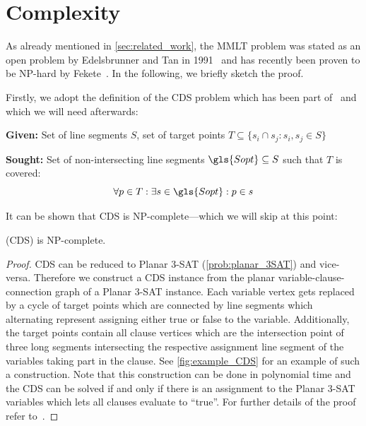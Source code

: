 \section{Complexity}
As already mentioned in \cref{sec:related_work}, the \gls{MMLT}
problem was stated as an open problem by Edelsbrunner and Tan in
1991~\cite{triangulation_minmax_length} and has recently been proven
to be NP-hard by Fekete~\cite{mmlt_complexity}. In the following, we
briefly sketch the proof.

Firstly, we adopt the definition of the \gls{CDS} problem which has
been part of~\cite{mmlt_complexity} and which we will need
afterwards:

\begin{problem}
  \label{prob:cds}\hfill
  \begin{labeling}{\hspace{4em}}
    \item[\textbf{Given:}]
      Set of line segments \(S\), 
      set of target points
      \(T \subseteq \{ s_i \cap s_j : s_i,s_j \in S \} \)
    \item[\textbf{Sought:}]
      Set of non-intersecting line segments
      \(\gls{Sopt} \subseteq S\) such that \(T\) is covered:
      \[ \forall p \in T: \exists s \in \gls{Sopt} : p \in s \]
  \end{labeling}
\end{problem}

It can be shown that \gls{CDS} is NP-complete---which we will skip at
this point:

\begin{theorem}
  \label{thm:complexity_cds}
   (\gls{CDS}) is NP-complete.
  \begin{proof}
  \gls{CDS} can be reduced to Planar 3-SAT (\cref{prob:planar_3SAT})
  and vice-versa. Therefore we construct a \gls{CDS} instance from
  the planar variable-clause-connection graph of a Planar 3-SAT
  instance. Each variable vertex gets replaced by a cycle of target
  points which are connected by line segments which alternating
  represent assigning either true or false to the variable.
  Additionally, the target points contain all clause vertices which
  are the intersection point of three long segments intersecting
  the respective assignment line segment of the variables taking
  part in the clause. See \cref{fig:example_CDS} for an example of
  such a construction. Note that this construction can be done in
  polynomial time and the \gls{CDS} can be solved if and
  only if there is an assignment to the Planar 3-SAT variables which
  lets all clauses evaluate to ``true''.
  For further details of the proof refer to~\cite{mmlt_complexity}.
  \end{proof}
\end{theorem}

